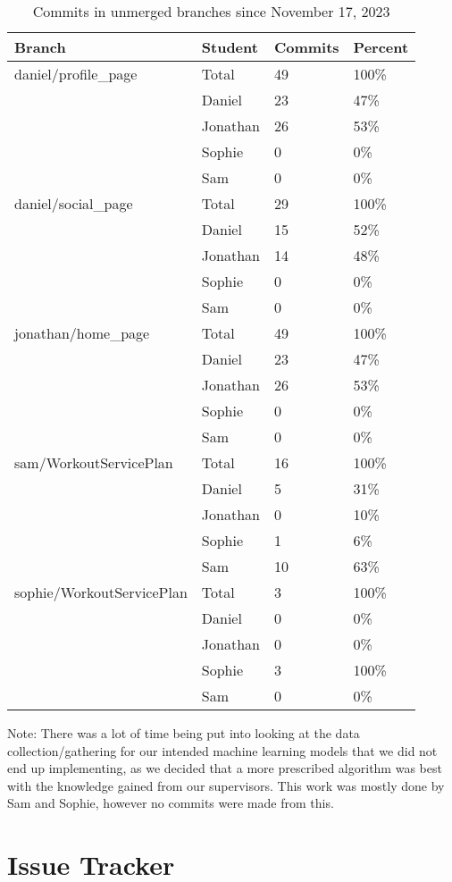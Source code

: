 \documentclass{article}
\begin{document}
\begin{table}[H]
\centering
\begin{tabular}{llll}
\toprule
\textbf{Branch} & \textbf{Student} & \textbf{Commits} & \textbf{Percent}\\
\midrule
daniel/profile\_page & Total & 49 & 100\% \\
& Daniel & 23 & 47\% \\
& Jonathan & 26 & 53\% \\
& Sophie & 0 & 0\% \\
& Sam & 0 & 0\% \\
\hline
daniel/social\_page & Total & 29 & 100\% \\
& Daniel & 15 & 52\% \\
& Jonathan & 14 & 48\% \\
& Sophie & 0 & 0\% \\
& Sam & 0 & 0\% \\
\hline
jonathan/home\_page & Total & 49 & 100\% \\
& Daniel & 23 & 47\% \\
& Jonathan & 26 & 53\% \\
& Sophie & 0 & 0\% \\
& Sam & 0 & 0\% \\
\hline
sam/WorkoutServicePlan & Total & 16 & 100\% \\
& Daniel & 5 & 31\% \\
& Jonathan & 0 & 10\% \\
& Sophie & 1 & 6\% \\
& Sam & 10 & 63\% \\
\hline
sophie/WorkoutServicePlan & Total & 3 & 100\% \\
& Daniel & 0 & 0\% \\
& Jonathan & 0 & 0\% \\
& Sophie & 3 & 100\% \\
& Sam & 0 & 0\% \\
\bottomrule
\end{tabular}
\caption{Commits in unmerged branches since November 17, 2023}
\end{table}

Note: There was a lot of time being put into looking at the data collection/gathering for our intended machine learning models that we did not end up implementing, as we decided that a more prescribed algorithm was best with the knowledge gained from our supervisors. This work was mostly done by Sam and Sophie, however no commits were made from this. 


\section{Issue Tracker}
\end{document}
